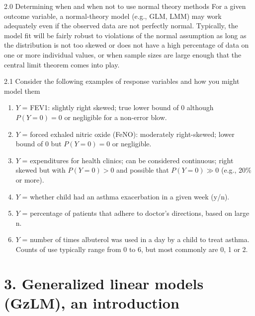 \documentclass[
  9pt,
  ignorenonframetext,
]{beamer}
\begin{document}
\begin{frame}{2.0 Determining when and when not to use normal theory
methods}
\protect\hypertarget{determining-when-and-when-not-to-use-normal-theory-methods-1}{}
For a given outcome variable, a normal-theory model (e.g., GLM, LMM) may
work adequately even if the observed data are not perfectly normal.
Typically, the model fit will be fairly robust to violations of the
normal assumption as long as the distribution is not too skewed or does
not have a high percentage of data on one or more individual values, or
when sample sizes are large enough that the central limit theorem comes
into play.
\end{frame}

\begin{frame}{2.1 Consider the following examples of response variables
and how you might model them}
\protect\hypertarget{consider-the-following-examples-of-response-variables-and-how-you-might-model-them}{}
\begin{enumerate}
\item
  \(Y\) = FEV1: slightly right skewed; true lower bound of 0 although
  \(P(Y=0)=0\) or negligible for a non-error blow.
\item
  \(Y\) = forced exhaled nitric oxide (FeNO): moderately right-skewed;
  lower bound of 0 but \(P(Y=0)=0\) or negligible.
\item
  \(Y\) = expenditures for health clinics; can be considered continuous;
  right skewed but with \(P(Y=0)>0\) and possible that \(P(Y=0)\gg 0\)
  (e.g., 20\% or more).
\item
  \(Y\) = whether child had an asthma exacerbation in a given week
  (y/n).
\item
  \(Y\) = percentage of patients that adhere to doctor's directions,
  based on large n.
\item
  \(Y\) = number of times albuterol was used in a day by a child to
  treat asthma. Counts of use typically range from 0 to 6, but most
  commonly are 0, 1 or 2.
\end{enumerate}
\end{frame}

\hypertarget{generalized-linear-models-gzlm-an-introduction}{%
\section{3. Generalized linear models (GzLM), an
introduction}\label{generalized-linear-models-gzlm-an-introduction}}
\end{document}
